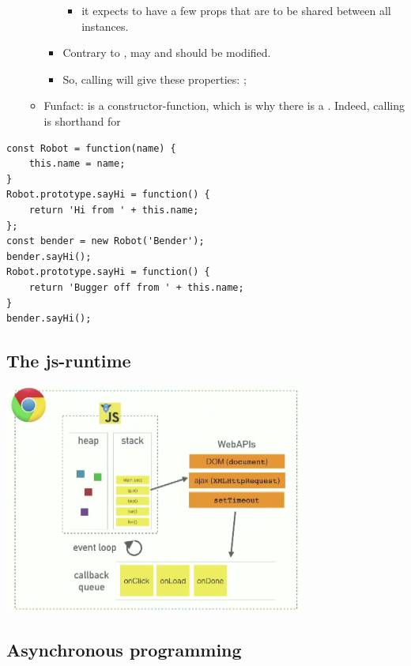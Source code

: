 \begin{itemize}
\begin{itemize}
\begin{itemize}
\begin{itemize}
                            \item it expects  to have a few props that are to be shared between all instances.
                        \end{itemize}
                    \item Contrary to ,  may and should be modified.
                    \item So, calling  will give  these properties: ;
                \end{itemize}
            \item Funfact:  is a constructor-function, which is why there is a . Indeed, calling  is shorthand for  
        \end{itemize}
\end{itemize}

\begin{lstlisting}
const Robot = function(name) {
    this.name = name;
}
Robot.prototype.sayHi = function() {
    return 'Hi from ' + this.name;
};
const bender = new Robot('Bender');
bender.sayHi();
Robot.prototype.sayHi = function() {
    return 'Bugger off from ' + this.name;
}
bender.sayHi();
\end{lstlisting}

\subsection{The js-runtime}
\includegraphics[width=0.75\textwidth]{images/js_event_loop.png}

\subsection{Asynchronous programming}

